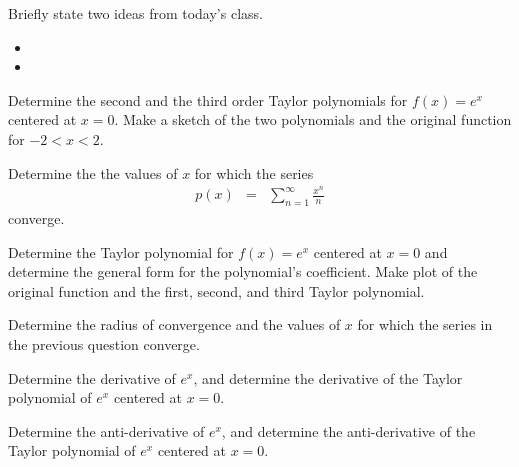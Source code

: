 \postClass

\begin{problem}
\item Briefly state two ideas from today's class.
  \begin{itemize}
  \item
  \item
  \end{itemize}
\item
  \begin{subproblem}
    \item
  \end{subproblem}
\end{problem}



\begin{problem}
\item Determine the second and the third order Taylor polynomials for
  $f(x)=e^x$ centered at $x=0$. Make a sketch of the two polynomials
  and the original function for $-2 < x < 2$.

  \vfill

  \clearpage

\item Determine the the values of $x$ for which the series
  \begin{eqnarray*}
    p(x) & = & \sum^\infty_{n=1} \frac{x^n}{n}
  \end{eqnarray*}
  converge.

  \vfill

\end{problem}


\begin{problem}
\item Determine the Taylor polynomial for $f(x)=e^x$ centered at $x=0$
  and determine the general form for the polynomial's coefficient.
  Make plot of the original function and the first, second, and third Taylor polynomial.

  \vfill


  \clearpage

\item Determine the radius of convergence and the values of $x$ for
  which the series in the previous question converge.

  \vfill


  \clearpage

\item Determine the derivative of $e^x$, and determine the derivative of the Taylor
polynomial of $e^x$ centered at $x=0$.
  \vfill

  \clearpage

  \item Determine the anti-derivative of $e^x$, and determine the anti-derivative of the Taylor
  polynomial of $e^x$ centered at $x=0$.
    \vfill

\end{problem}


